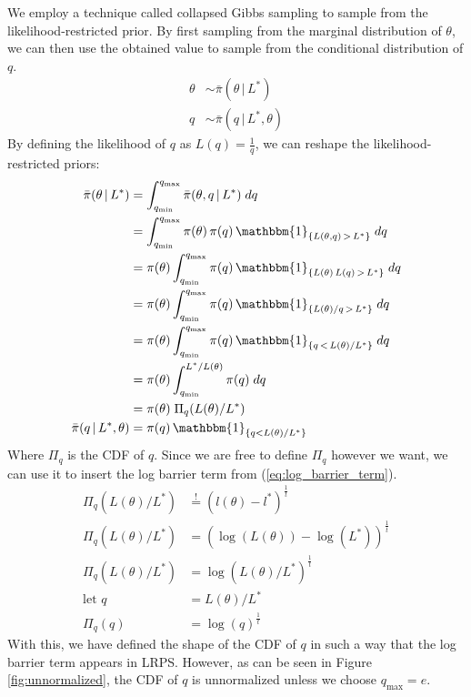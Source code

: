 \documentclass[12pt, a4paper]{report}
\begin{document}
We employ a technique called collapsed Gibbs sampling \cite{collapsed_gibbs} to sample from the likelihood-restricted prior.
By first sampling from the marginal distribution of $\theta$, we can then use the obtained value to sample from the conditional distribution of $q$.
\begin{align*}
    \theta &\sim  \bar{\pi}(\theta \,|\, L^*) \\
    q &\sim  \bar{\pi}(q \,|\, L^*, \theta)
\end{align*}
By defining the likelihood of $q$ as $L(q) = \frac{1}{q}$, we can reshape the likelihood-restricted priors:
\begin{align*}
    \bar{\pi}(\theta \,|\, L^*) &= \int_{q_{\textrm{min}}}^{q_{\textrm{max}}} \bar{\pi}(\theta, q \,|\, L^*) \; dq \\
    &= \int_{q_{\textrm{min}}}^{q_{\textrm{max}}} \pi(\theta) \, \pi(q) \, \mathbbm{1}_{\{L(\theta, q) \,>\, L^*\}} \; dq \\
    &= \pi(\theta) \int_{q_{\textrm{min}}}^{q_{\textrm{max}}} \pi(q) \, \mathbbm{1}_{\{L(\theta) \, L(q) \,>\, L^*\}} \; dq \\
    &= \pi(\theta) \int_{q_{\textrm{min}}}^{q_{\textrm{max}}} \pi(q) \, \mathbbm{1}_{\{L(\theta) / q \,>\, L^*\}} \; dq \\
    &= \pi(\theta) \int_{q_{\textrm{min}}}^{q_{\textrm{max}}} \pi(q) \, \mathbbm{1}_{\{q \,<\, L(\theta) / L^*\}} \; dq \\
    &= \pi(\theta) \int_{q_{\textrm{min}}}^{L^* / L(\theta)} \pi(q) \; dq \\
    &= \pi(\theta) \; \Pi_q(L(\theta) / L^*) \\
    \bar{\pi}(q \,|\, L^*, \theta) &= \pi(q) \, \mathbbm{1}_{\{q < L(\theta) / L^*\}}
\end{align*}
Where $\Pi_q$ is the CDF of $q$.
Since we are free to define $\Pi_q$ however we want, we can use it to insert the log barrier term from (\ref{eq:log_barrier_term}).
\begin{align*}
    \Pi_q(L(\theta) / L^*) &\overset{!}{=} (l(\theta) - l^*)^{\frac{1}{t}} \\
    \Pi_q(L(\theta) / L^*) &=(\log(L(\theta)) - \log(L^*))^{\frac{1}{t}} \\
    \Pi_q(L(\theta) / L^*) &= \log(L(\theta) / L^*)^{\frac{1}{t}} \\
    \textrm{let } q &= L(\theta) / L^* \\
    \Pi_q(q) &= \log(q)^{\frac{1}{t}}
\end{align*}
With this, we have defined the shape of the CDF of $q$ in such a way that the log barrier term appears in LRPS.
However, as can be seen in Figure \ref{fig:unnormalized}, the CDF of $q$ is unnormalized unless we choose $q_{\textrm{max}}=e$.
\end{document}
